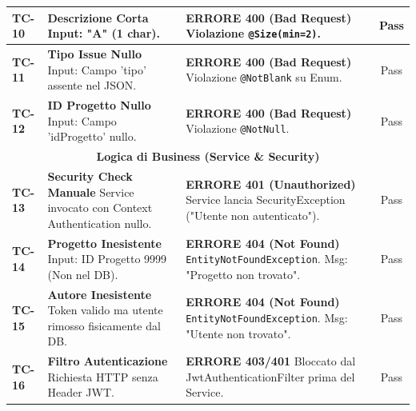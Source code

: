 \documentclass[a4paper,12pt]{article}
\begin{document}
\begin{longtable}{|p{1.2cm}|p{6.0cm}|p{5.5cm}|c|}
    \textbf{TC-10} & 
    \textbf{Descrizione Corta} \newline
    Input: "A" (1 char). & 
    \textbf{ERRORE 400 (Bad Request)} \newline
    Violazione \texttt{@Size(min=2)}. & 
    Pass \\ \hline

    \textbf{TC-11} & 
    \textbf{Tipo Issue Nullo} \newline
    Input: Campo 'tipo' assente nel JSON. & 
    \textbf{ERRORE 400 (Bad Request)} \newline
    Violazione \texttt{@NotBlank} su Enum. & 
    Pass \\ \hline

    \textbf{TC-12} & 
    \textbf{ID Progetto Nullo} \newline
    Input: Campo 'idProgetto' nullo. & 
    \textbf{ERRORE 400 (Bad Request)} \newline
    Violazione \texttt{@NotNull}. & 
    Pass \\ \hline

    \multicolumn{4}{|c|}{\cellcolor{BoxLight}\textbf{Logica di Business (Service \& Security)}} \\ \hline

    \textbf{TC-13} & 
    \textbf{Security Check Manuale} \newline
    Service invocato con Context Authentication nullo. & 
    \textbf{ERRORE 401 (Unauthorized) } \newline
    Service lancia SecurityException ("Utente non autenticato"). & 
    Pass \\ \hline

    \textbf{TC-14} & 
    \textbf{Progetto Inesistente} \newline
    Input: ID Progetto 9999 (Non nel DB). & 
    \textbf{ERRORE 404 (Not Found)} \newline
    \texttt{EntityNotFoundException}. Msg: "Progetto non trovato". & 
    Pass \\ \hline

    \textbf{TC-15} & 
    \textbf{Autore Inesistente} \newline
    Token valido ma utente rimosso fisicamente dal DB. & 
    \textbf{ERRORE 404 (Not Found)} \newline
     \texttt{EntityNotFoundException}. Msg: "Utente non trovato". & 
    Pass  \\ \hline

    \textbf{TC-16} & 
    \textbf{Filtro Autenticazione} \newline
    Richiesta HTTP senza Header JWT. & 
    \textbf{ERRORE 403/401} \newline
    Bloccato dal JwtAuthenticationFilter prima del Service. & 
    Pass \\ \hline
\end{longtable}
\newpage
\end{document}
